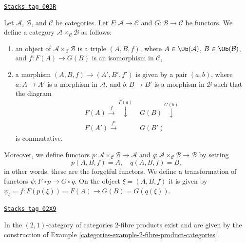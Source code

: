 \begin{example}
\label{categories-example-2-fibre-product-categories}
\href{https://stacks.math.columbia.edu/tag/003R}{\texttt{Stacks tag 003R}}

Let $\mathcal{A}$, $\mathcal{B}$, and $\mathcal{C}$ be categories.
Let $F : \mathcal{A} \to \mathcal{C}$ and $G : \mathcal{B} \to \mathcal{C}$
be functors. We define a category
$\mathcal{A} \times_\mathcal{C} \mathcal{B}$ as follows:
\begin{enumerate}
\item an object of $\mathcal{A} \times_\mathcal{C} \mathcal{B}$ is a triple
$(A, B, f)$, where $A\in \Ob(\mathcal{A})$, $B\in \Ob(\mathcal{B})$,
and $f : F(A) \to G(B)$ is an isomorphism in $\mathcal{C}$,
\item a morphism $(A, B, f) \to (A', B', f')$ is given by a pair $(a, b)$, where
$a : A \to A'$ is a morphism in $\mathcal{A}$, and $b : B \to B'$ is a
morphism in $\mathcal{B}$ such that the diagram
$$
\begin{array}{cc}F(A) \overset{f}{\longrightarrow}\overset{F(a)}{\downarrow} & G(B) \overset{G(b)}{\downarrow} \\ F(A') \overset{f'}{\longrightarrow} & G(B')\end{array}
$$
is commutative.
\end{enumerate}
Moreover, we define functors
$p : \mathcal{A} \times_\mathcal{C}\mathcal{B} \to \mathcal{A}$
and
$q : \mathcal{A} \times_\mathcal{C}\mathcal{B} \to \mathcal{B}$
by setting
$$
p(A, B, f) = A, \quad q(A, B, f) = B,
$$
in other words, these are the forgetful functors.
We define a transformation of functors $\psi : F \circ p \to G \circ q$.
On the object $\xi = (A, B, f)$ it is given by
$\psi_\xi = f : F(p(\xi)) = F(A) \to G(B) = G(q(\xi))$.
\end{example}

\begin{lemma}
\label{categories-lemma-2-fibre-product-categories}
\href{https://stacks.math.columbia.edu/tag/02X9}{\texttt{Stacks tag 02X9}}

In the $(2, 1)$-category of categories $2$-fibre products exist and
are given by the construction of
Example \ref{categories-example-2-fibre-product-categories}.
\end{lemma}

